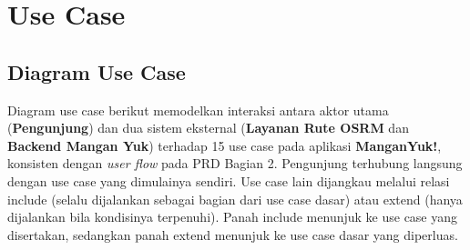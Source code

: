 \chapter{Use Case}
\label{bab:use-case}

\section{Diagram Use Case}

Diagram use case berikut memodelkan interaksi antara aktor utama (\textbf{Pengunjung}) dan dua sistem eksternal (\textbf{Layanan Rute OSRM} dan \textbf{Backend Mangan Yuk}) terhadap 15 use case pada aplikasi \textbf{ManganYuk!}, konsisten dengan \textit{user flow} pada PRD Bagian 2. Pengunjung terhubung langsung dengan use case yang dimulainya sendiri. Use case lain dijangkau melalui relasi \mbox{\guillemotleft include\guillemotright} (selalu dijalankan sebagai bagian dari use case dasar) atau \mbox{\guillemotleft extend\guillemotright} (hanya dijalankan bila kondisinya terpenuhi). Panah \mbox{\guillemotleft include\guillemotright} menunjuk ke use case yang disertakan, sedangkan panah \mbox{\guillemotleft extend\guillemotright} menunjuk ke use case dasar yang diperluas.

